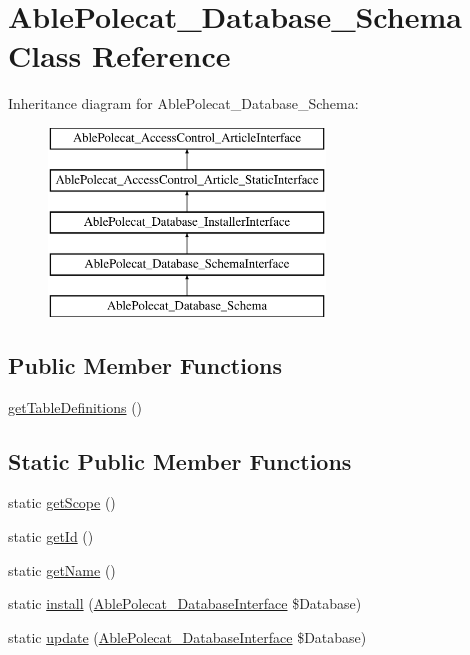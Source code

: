 \hypertarget{class_able_polecat___database___schema}{}\section{Able\+Polecat\+\_\+\+Database\+\_\+\+Schema Class Reference}
\label{class_able_polecat___database___schema}
Inheritance diagram for Able\+Polecat\+\_\+\+Database\+\_\+\+Schema\+:\begin{figure}[H]
\begin{center}
\leavevmode
\includegraphics[height=5.000000cm]{class_able_polecat___database___schema}
\end{center}
\end{figure}
\subsection*{Public Member Functions}
\begin{DoxyCompactItemize}
\item 
\hyperlink{class_able_polecat___database___schema_a73aa038e374cfd590b1605a541498eb0}{get\+Table\+Definitions} ()
\end{DoxyCompactItemize}
\subsection*{Static Public Member Functions}
\begin{DoxyCompactItemize}
\item 
static \hyperlink{class_able_polecat___database___schema_ad9ade868bd136d32967059d1cccb3e92}{get\+Scope} ()
\item 
static \hyperlink{class_able_polecat___database___schema_acfaa3a96d0cb5a4c0d4d710dcba41e9e}{get\+Id} ()
\item 
static \hyperlink{class_able_polecat___database___schema_a4ef9bd37ba3ce8a13c1e8bcf4f72a630}{get\+Name} ()
\item 
static \hyperlink{class_able_polecat___database___schema_a97e9bacf538c072e0542eeb96d2475af}{install} (\hyperlink{interface_able_polecat___database_interface}{Able\+Polecat\+\_\+\+Database\+Interface} \$Database)
\item 
static \hyperlink{class_able_polecat___database___schema_a8398510e79e9787266fe116d6431948c}{update} (\hyperlink{interface_able_polecat___database_interface}{Able\+Polecat\+\_\+\+Database\+Interface} \$Database)
\end{DoxyCompactItemize}
